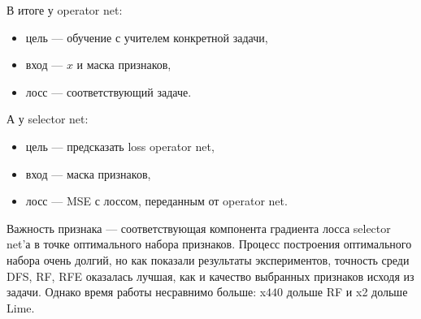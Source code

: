 \documentclass[12pt]{article}
\begin{document}
В итоге у operator net:
\begin{itemize}[noitemsep]
    \item цель --- обучение с учителем конкретной задачи,
    \item вход --- $x$ и маска признаков,
    \item лосс --- соответствующий задаче.
\end{itemize}
А у selector net:
\begin{itemize}[noitemsep]
    \item цель --- предсказать loss operator net,
    \item вход --- маска признаков,
    \item лосс --- MSE с лоссом, переданным от operator net.
\end{itemize}
Важность признака --- соответствующая компонента градиента лосса selector net'а в точке оптимального набора признаков. Процесс построения оптимального набора очень долгий, но как показали результаты экспериментов, точность среди DFS, RF, RFE оказалась лучшая, как и качество выбранных признаков исходя из задачи. Однако время работы несравнимо больше: x$440$ дольше RF и x2 дольше Lime.

\newpage
\end{document}
